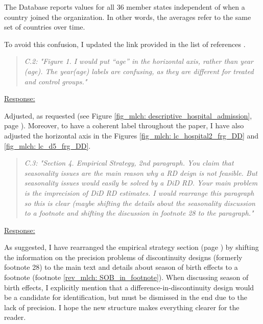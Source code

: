  
The Database reports values for all 36 member states independent of when a country joined the organization. In other words, the averages refer to the same set of countries over time. 

To avoid this confusion, I updated the link provided in the list of references \citep{oecd_data_leave}.











{}
\bigskip
\begin{quote}
	\textit{C.2: "Figure 1. I would put “age” in the horizontal axis, rather than year (age). The year(age) labels are confusing, as they are different for treated and control groups."}
\end{quote}
\underline{Response:}

Adjusted, as requested (see Figure \ref{fig_mlch: descriptive_hospital_admission}, page \pageref{fig_mlch: descriptive_hospital_admission}). Moreover, to have a coherent label throughout the paper, I have also adjusted the horizontal axis in the Figures \ref{fig_mlch: lc_hospital2_frg_DD} and \ref{fig_mlch: lc_d5_frg_DD}. 






\bigskip
{}
\begin{quote}
	\textit{C.3: "Section 4. Empirical Strategy, 2nd paragraph. You claim that seasonality issues are the main reason why a RD deign is not feasible. But seasonality issues would easily be solved by a DiD RD. Your main problem is the imprecision of DiD RD estimates. I would rearrange this paragraph so this is clear (maybe shifting the details about the seasonality discussion to a footnote and shifting the discussion in footnote 28 to the paragraph."}
\end{quote}
\underline{Response:}


As suggested, I have rearranged the empirical strategy section (page \pageref{sec_mlch:empirical_strategy}) by shifting the information on the precision problems of discontinuity designs (formerly footnote 28) to the main text and details about season of birth effects to a footnote (footnote \ref{rev_mlch: SOB_in_footnote}). When discussing season of birth effects, I explicitly mention that a difference-in-discontinuity design would be a candidate for identification, but must be dismissed in the end due to the lack of precision. I hope the new structure makes everything clearer for the reader.






